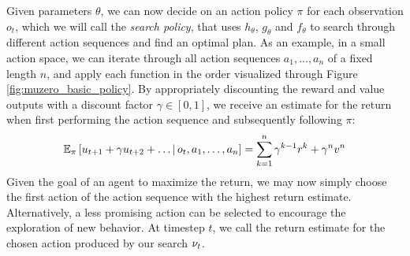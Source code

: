 Given parameters $\theta$, we can now decide on an action policy $\pi$ for each observation $o_t$, which we will call the \textit{search policy}, that uses $h_\theta$, $g_\theta$ and $f_\theta$ to search through different action sequences and find an optimal plan. As an example, in a small action space, we can iterate through all action sequences $a_1, ..., a_n$ of a fixed length $n$, and apply each function in the order visualized through Figure \ref{fig:muzero_basic_policy}. By appropriately discounting the reward and value outputs with a discount factor $\gamma \in [0, 1]$, we receive an estimate for the return when first performing the action sequence and subsequently following $\pi$:
\begin{equation*}
    \mathbb{E}_\pi\left[
        u_{t+1} + \gamma u_{t+2} + \dots \,\middle|\, o_t, a_1, \dots, a_n
    \right] =
    \sum_{k=1}^n \gamma^{k-1} r^k + \gamma^n v^n
\end{equation*}
Given the goal of an agent to maximize the return, we may now simply choose the first action of the action sequence with the highest return estimate. Alternatively, a less promising action can be selected to encourage the exploration of new behavior. At timestep $t$, we call the return estimate for the chosen action produced by our search $\nu_t$.
